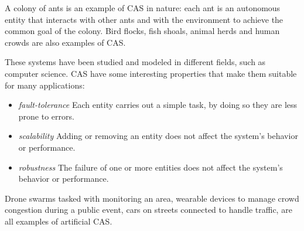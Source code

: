 \documentclass[12pt,a4paper,openright,twoside]{book}
\begin{document}
A colony of ants is an example of \ac{CAS} in nature: each ant is an autonomous entity that interacts with other ants and with the environment to achieve the common goal of the colony. 
Bird flocks, fish shoals, animal herds and human crowds are also examples of \ac{CAS}.

These systems have been studied and modeled in different fields, such as computer science.
\ac{CAS} have some interesting properties that make them suitable for many applications:

\begin{itemize}
  \item \textit{fault-tolerance} Each entity carries out a simple task, by doing so they are less prone to errors.
  \item \textit{scalability} Adding or removing an entity does not affect the system's behavior or performance.
  \item \textit{robustness} The failure of one or more entities does not affect the system's behavior or performance.
\end{itemize}

Drone swarms tasked with monitoring an area, wearable devices to manage crowd congestion during a public event, cars on streets connected to handle traffic, are all examples of artificial CAS. \cite{2}
\end{document}
